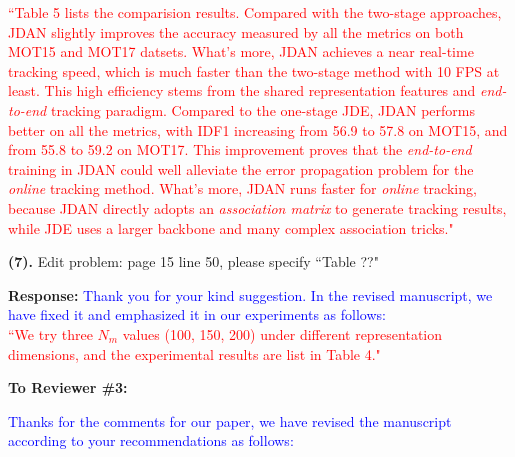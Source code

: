 \documentclass[12pt,journal,onecolumn]{IEEEtran}
\begin{document}
\textcolor{red}{
``Table 5 lists the comparision results.
Compared with the two-stage approaches, JDAN slightly improves the accuracy measured by all the metrics on both MOT15 and MOT17 datsets.
What's more, JDAN achieves a near real-time tracking speed, which is much faster than the two-stage method with 10 FPS at least.
This high efficiency stems from the shared representation features and \emph{end-to-end} tracking paradigm.
Compared to the one-stage JDE, JDAN performs better on all the metrics, with IDF1 increasing from 56.9 to 57.8 on MOT15, and from 55.8 to 59.2 on MOT17.
This improvement proves that the \emph{end-to-end} training in JDAN could well alleviate the error propagation problem for the \emph{online} tracking method.
What's more, JDAN runs faster for \emph{online} tracking, because JDAN directly adopts an \emph{association matrix} to generate tracking results, while JDE uses a larger backbone and many complex association tricks."
}
\vspace{8pt}



\textbf{(7).} Edit problem: page 15 line 50, please specify ``Table ??"

\textbf{Response:} \textcolor{blue}{Thank you for your kind suggestion. 
In the revised manuscript, we have fixed it and emphasized it in our experiments as follows: \\
}
\textcolor{red}{
``We try three $N_m$ values (100, 150, 200) under different representation dimensions, 
and the experimental results are list in Table 4."
} 



\vspace{8pt}


\vspace{8pt}

\newpage




\textbf{To Reviewer \#3:}

\textcolor{blue}{Thanks for the comments for our paper, we have revised the manuscript according to your recommendations as follows:}
\end{document}
